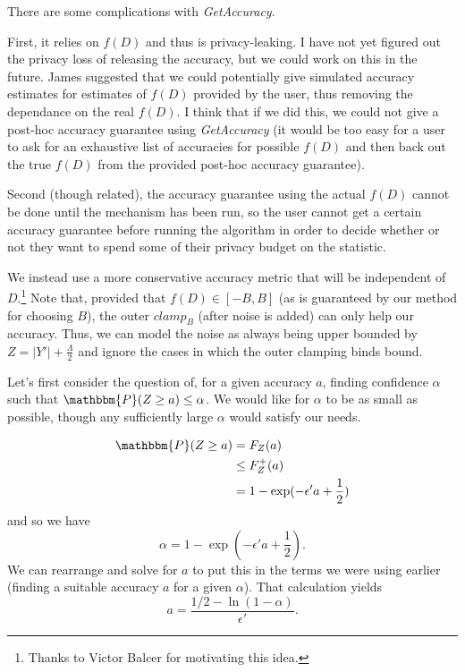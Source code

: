 \documentclass[11pt]{scrartcl} %
\begin{document}
There are some complications with \emph{GetAccuracy}. \newline

First, it relies on $f(D)$ and thus is privacy-leaking. I have not yet figured out the privacy loss of releasing the accuracy,
but we could work on this in the future. James suggested that we could potentially give simulated accuracy estimates
for estimates of $f(D)$ provided by the user, thus removing the dependance on the real $f(D)$.
I think that if we did this, we could not give a post-hoc accuracy guarantee using \emph{GetAccuracy}
(it would be too easy for a user to ask for an exhaustive list of accuracies for possible $f(D)$ and then back out the true
$f(D)$ from the provided post-hoc accuracy guarantee). \newline

Second (though related), the accuracy guarantee using the actual $f(D)$ cannot be done until the mechanism has been run,
so the user cannot get a certain accuracy guarantee before running the algorithm in order to decide whether or
not they want to spend some of their privacy budget on the statistic. \newline

We instead use a more conservative accuracy metric that will be independent of $D$.\footnote{Thanks to Victor Balcer for motivating
this idea.} Note that, provided that $f(D) \in [-B, B]$ (as is guaranteed by our method for choosing $B$),
the outer $clamp_B$ (after noise is added) can only help our accuracy. Thus, we can model the noise as always being upper bounded by
$Z = \vert Y' \vert + \frac{\Lambda}{2}$ and ignore the cases in which the outer clamping binds bound. \newline

Let's first consider the question of, for a given accuracy $a$, finding confidence $\alpha$ such that
$\mathbbm{P}(Z \geq a) \leq \alpha$. We would like for $\alpha$ to be as small as possible, though any sufficiently large
$\alpha$ would satisfy our needs.

\begin{align*}
	\mathbbm{P}(Z \geq a) &= F_{Z}(a) \\
						  &\leq F_{Z}^{+}(a) \\
						  &= 1 - \exp(-\epsilon' a + \frac{1}{2}) \\
\end{align*}
and so we have
\[ \alpha = 1 - \exp(-\epsilon' a + \frac{1}{2}). \]
We can rearrange and solve for $a$ to put this in the terms we were using earlier (finding a suitable accuracy $a$ for
a given $\alpha$). That calculation yields
\[ a = \frac{1/2 - \ln(1 - \alpha)}{\epsilon'}. \]
\end{document}

